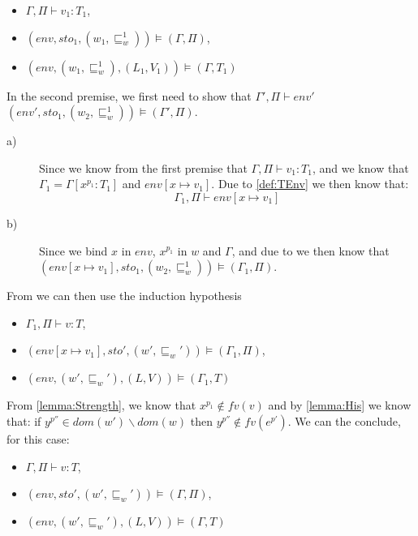 \begin{itemize}
	\item $\Gamma,\Pi\vdash v_1:T_1$,
	\item $(env,sto_1,(w_1,\sqsubseteq_w^1))\models(\Gamma,\Pi)$,
	\item $(env,(w_1,\sqsubseteq_w^1),(L_1,V_1))\models(\Gamma,T_1)$
\end{itemize}
In the second premise, we first need to show that  $\Gamma',\Pi\vdash env'$\\
	 $(env',sto_1,(w_2,\sqsubseteq_w^1))\models(\Gamma',\Pi)$.
	\begin{description}
		\item[a)] Since we know from the first premise that $\Gamma,\Pi\vdash v_1:T_1$, and we know that\\
			$\Gamma_1=\Gamma[x^{p_1}:T_1]$ and $env[x\mapsto v_1]$.
			Due to \cref{def:TEnv} we then know that:
			$$\Gamma_1,\Pi\vdash env[x\mapsto v_1]$$
		\item[b)] Since we bind $x$ in $env$, $x^{p_1}$ in $w$ and $\Gamma$, and due to  we then know that $(env[x\mapsto v_1],sto_1,(w_2,\sqsubseteq_w^1))\models(\Gamma_1,\Pi)$.
	\end{description}
	From   we can then use the induction hypothesis
	\begin{itemize}
		\item $\Gamma_1,\Pi\vdash v:T$,
		\item $(env[x\mapsto v_1],sto',(w',\sqsubseteq_w'))\models(\Gamma_1,\Pi)$,
		\item $(env,(w',\sqsubseteq_w'),(L,V))\models(\Gamma_1,T)$
	\end{itemize}
	From \cref{lemma:Strength}, we know that $x^{p_1}\notin fv(v)$ and by \cref{lemma:His} we know that: if $y^{p''}\in dom(w')\backslash dom(w)$ then $y^{p''}\notin fv(e^{p'})$.
	We can the conclude, for this case:
	\begin{itemize}
		\item $\Gamma,\Pi\vdash v:T$,
		\item $(env,sto',(w',\sqsubseteq_w'))\models(\Gamma,\Pi)$,
		\item $(env,(w',\sqsubseteq_w'),(L,V))\models(\Gamma,T)$
	\end{itemize}
